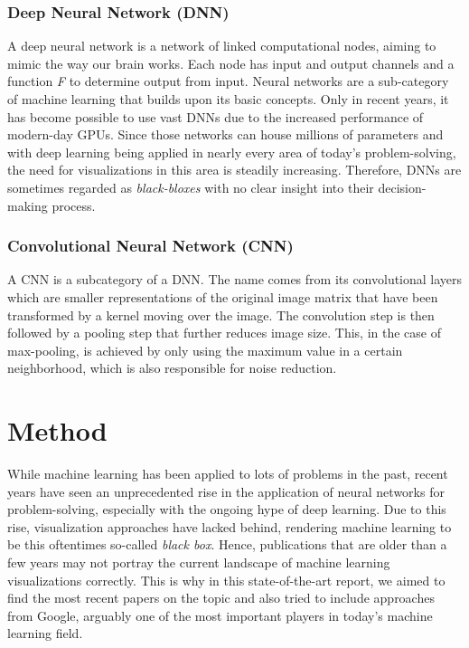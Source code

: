 \documentclass{acmsiggraph}               %
\begin{document}
\subsubsection{Deep Neural Network (DNN)}
A deep neural network is a network of linked computational nodes, aiming to mimic the way our brain works. Each node has input and output channels and a function \textit{F} to determine output from input. Neural networks are a sub-category of machine learning that builds upon its basic concepts. Only in recent years, it has become possible to use vast DNNs due to the increased performance of modern-day GPUs. Since those networks can house millions of parameters and with deep learning being applied in nearly every area of today's problem-solving, the need for visualizations in this area is steadily increasing. Therefore, DNNs are sometimes regarded as \textit{black-bloxes} with no clear insight into their decision-making process.

\subsubsection{Convolutional Neural Network (CNN)}
A CNN is a subcategory of a DNN. The name comes from its convolutional layers which are smaller representations of the original image matrix that have been transformed by a kernel moving over the image. The convolution step is then followed by a pooling step that further reduces image size. This, in the case of max-pooling, is achieved by only using the maximum value in a certain neighborhood, which is also responsible for noise reduction.

\section{Method}
While machine learning has been applied to lots of problems in the past, recent years have seen an unprecedented rise in the application of neural networks for problem-solving, especially with the ongoing hype of deep learning. Due to this rise, visualization approaches have lacked behind, rendering machine learning to be this oftentimes so-called \textit{black box}. Hence, publications that are older than a few years may not portray the current landscape of machine learning visualizations correctly. This is why in this state-of-the-art report, we aimed to find the most recent papers on the topic and also tried to include approaches from Google, arguably one of the most important players in today's machine learning field.
\end{document}
